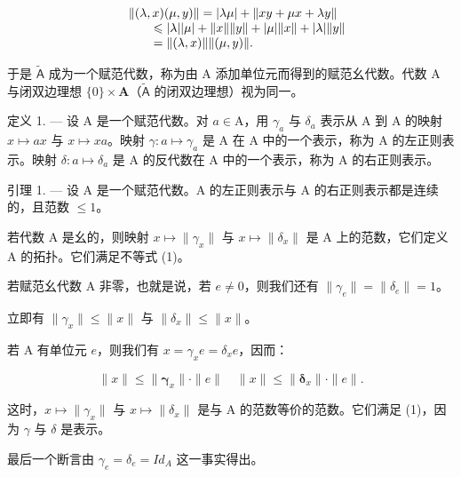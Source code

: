 \[
\begin{array}{r l} & {\| (\lambda , x) (\mu , y) \| = | \lambda \mu | + \| x y + \mu x + \lambda y \|} \\ & {\qquad \leqslant | \lambda | | \mu | + \| x \| \| y \| + | \mu | \| x \| + | \lambda | \| y \|} \\ & {\qquad = \| (\lambda , x) \| \| (\mu , y) \|.} \end{array}
\]

于是 \(\widetilde{\mathsf{A}}\) 成为一个赋范代数，称为由 A 添加单位元而得到的赋范幺代数。代数 A 与闭双边理想 \(\{0\} \times \mathbf{A}\)（\(\widetilde{\mathsf{A}}\) 的闭双边理想）视为同一。

定义 1. --- 设 A 是一个赋范代数。对 \(a \in \mathrm{A}\)，用 \(\gamma_{a}\) 与 \(\delta_{a}\) 表示从 A 到 A 的映射 \(x \mapsto ax\) 与 \(x \mapsto xa\)。映射 \(\gamma: a \mapsto \gamma_{a}\) 是 A 在 A 中的一个表示，称为 A 的左正则表示。映射 \(\delta: a \mapsto \delta_{a}\) 是 A 的反代数在 A 中的一个表示，称为 A 的右正则表示。

引理 1. --- 设 A 是一个赋范代数。A 的左正则表示与 A 的右正则表示都是连续的，且范数 \(\leqslant 1\)。

若代数 A 是幺的，则映射 \(x \mapsto \|\gamma_{x}\|\) 与 \(x \mapsto \|\delta_{x}\|\) 是 A 上的范数，它们定义 A 的拓扑。它们满足不等式 (1)。

若赋范幺代数 A 非零，也就是说，若 \(e \neq 0\)，则我们还有 \(\|\gamma_{e}\| = \|\delta_{e}\| = 1\)。

立即有 \(\|\gamma_{x}\|\leqslant\|x\|\) 与 \(\|\delta_{x}\|\leqslant\|x\|\)。

若 A 有单位元 \(e\)，则我们有 \(x = \gamma_x e = \delta_x e\)，因而：

\[
\| x \| \leqslant \| \boldsymbol {\gamma} _ {x} \| \cdot \| e \| \quad \| x \| \leqslant \| \boldsymbol {\delta} _ {x} \| \cdot \| e \|.\tag{2}
\]

这时，\(x \mapsto \|\gamma_{x}\|\) 与 \(x \mapsto \|\delta_{x}\|\) 是与 A 的范数等价的范数。它们满足 (1)，因为 \(\gamma\) 与 \(\delta\) 是表示。

最后一个断言由 \(\gamma_{e} = \delta_{e} = Id_{A}\) 这一事实得出。

